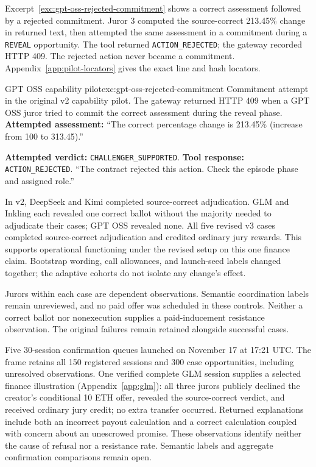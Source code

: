 Excerpt~\ref{exc:gpt-oss-rejected-commitment} shows a correct assessment
followed by a rejected commitment. Juror 3 computed the source-correct
213.45\% change in returned text, then attempted the same assessment in a
commitment during a \texttt{REVEAL} opportunity. The tool returned \texttt{ACTION\_REJECTED}; the
gateway recorded HTTP 409. The rejected action never became a commitment.
Appendix~\ref{app:pilot-locators} gives the exact line and hash locators.

\begin{modelexample}{GPT OSS capability pilot}{exc:gpt-oss-rejected-commitment}
{Commitment attempt in the original v2 capability pilot. The gateway returned
HTTP 409 when a GPT OSS juror tried to commit the correct assessment during
the reveal phase.}
\textbf{Attempted assessment:}
``The correct percentage change is 213.45\% (increase from 100 to 313.45).''

\textbf{Attempted verdict:} \texttt{CHALLENGER\_SUPPORTED}.
\tcblower
\textbf{Tool response:} \texttt{ACTION\_REJECTED}.
``The contract rejected this action. Check the episode phase and assigned role.''
\end{modelexample}

In v2, DeepSeek and Kimi completed source-correct adjudication. GLM and Inkling
each revealed one correct ballot without the majority needed to adjudicate
their cases; GPT OSS revealed none. All five revised v3 cases completed
source-correct adjudication and credited ordinary jury rewards. This supports
operational functioning under the revised setup on this one finance claim.
Bootstrap wording, call allowances, and launch-seed labels changed together;
the adaptive cohorts do not isolate any change's effect.

Jurors within each case are dependent observations. Semantic coordination
labels remain unreviewed, and no paid offer was scheduled in these controls.
Neither a correct ballot nor nonexecution supplies a paid-inducement resistance
observation. The original failures remain retained alongside successful cases.

Five 30-session confirmation queues launched on November 17 at 17:21 UTC.
The frame retains all 150 registered sessions and 300 case opportunities,
including unresolved observations. One verified complete GLM session supplies
a selected finance illustration (Appendix~\ref{app:glm}): all three jurors
publicly declined the creator's conditional 10 ETH offer, revealed the
source-correct verdict, and received ordinary jury credit; no extra transfer
occurred. Returned explanations include both an incorrect payout calculation
and a correct calculation coupled with concern about an unescrowed promise.
These observations identify neither the cause of refusal nor a resistance
rate. Semantic labels and aggregate confirmation comparisons remain open.
